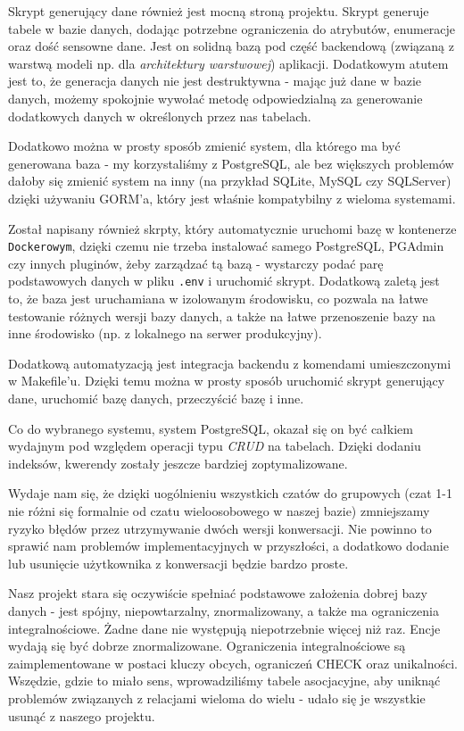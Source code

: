 \documentclass{article}
\begin{document}
Skrypt generujący dane również jest mocną stroną projektu. Skrypt generuje tabele w bazie danych, dodając potrzebne ograniczenia do atrybutów, enumeracje oraz dość sensowne dane. Jest on solidną bazą pod część backendową (związaną z warstwą modeli np. dla \textit{architektury warstwowej}) aplikacji. Dodatkowym atutem jest to, że generacja danych nie jest destruktywna - mając już dane w bazie danych, możemy spokojnie wywołać metodę odpowiedzialną za generowanie dodatkowych danych w określonych przez nas tabelach.

Dodatkowo można w prosty sposób zmienić system, dla którego ma być generowana baza - my korzystaliśmy z PostgreSQL, ale bez większych problemów dałoby się zmienić system na inny (na przykład SQLite, MySQL czy SQLServer) dzięki używaniu GORM'a, który jest właśnie kompatybilny z wieloma systemami. 

Został napisany również skrpty, który automatycznie uruchomi bazę w kontenerze \texttt{Dockerowym}, dzięki czemu nie trzeba instalować samego PostgreSQL, PGAdmin czy innych pluginów, żeby zarządzać tą bazą - wystarczy podać parę podstawowych danych w pliku \texttt{.env} i uruchomić skrypt. Dodatkową zaletą jest to, że baza jest uruchamiana w izolowanym środowisku, co pozwala na łatwe testowanie różnych wersji bazy danych, a także na łatwe przenoszenie bazy na inne środowisko (np. z lokalnego na serwer produkcyjny).

Dodatkową automatyzacją jest integracja backendu z komendami umieszczonymi w Makefile'u. Dzięki temu można w prosty sposób uruchomić skrypt generujący dane, uruchomić bazę danych, przeczyścić bazę i inne.

Co do wybranego systemu, system PostgreSQL, okazał się on być całkiem wydajnym pod względem operacji typu \textit{CRUD} na tabelach. Dzięki dodaniu indeksów, kwerendy zostały jeszcze bardziej zoptymalizowane.

Wydaje nam się, że dzięki uogólnieniu wszystkich czatów do grupowych (czat 1-1 nie różni się formalnie od czatu wieloosobowego w naszej bazie) zmniejszamy ryzyko błędów przez utrzymywanie dwóch wersji konwersacji. Nie powinno to sprawić nam problemów implementacyjnych w przyszłości, a dodatkowo dodanie lub usunięcie użytkownika z konwersacji będzie bardzo proste.

Nasz projekt stara się oczywiście spełniać podstawowe założenia dobrej bazy danych - jest spójny, niepowtarzalny, znormalizowany, a także ma ograniczenia integralnościowe. Żadne dane nie występują niepotrzebnie więcej niż raz. Encje wydają się być dobrze znormalizowane. Ograniczenia integralnościowe są zaimplementowane w postaci kluczy obcych, ograniczeń CHECK oraz unikalności. Wszędzie, gdzie to miało sens, wprowadziliśmy tabele asocjacyjne, aby uniknąć problemów związanych z relacjami wieloma do wielu - udało się je wszystkie usunąć z naszego projektu.
\end{document}
